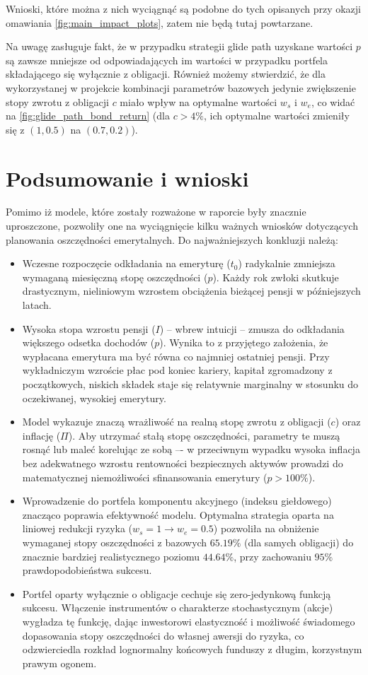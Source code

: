 \documentclass{article}
\begin{document}
Wnioski, które można z nich wyciągnąć są podobne do tych opisanych przy okazji omawiania \autoref{fig:main_impact_plots}, zatem nie będą tutaj powtarzane.

Na uwagę zasługuje fakt, że w przypadku strategii glide path uzyskane wartości $p$ są zawsze mniejsze od odpowiadających im wartości w przypadku portfela składającego się wyłącznie z obligacji.
Również możemy stwierdzić, że dla wykorzystanej w projekcie kombinacji parametrów bazowych jedynie zwiększenie stopy zwrotu z obligacji $c$ miało wpływ na optymalne wartości $w_s$ i $w_e$, co widać na \autoref{fig:glide_path_bond_return} (dla $c > 4\%$, ich optymalne wartości zmieniły się z $(1, 0.5)$ na $(0.7, 0.2)$).

\section{Podsumowanie i wnioski}
Pomimo iż modele, które zostały rozważone w raporcie były znacznie uproszczone, pozwoliły one na wyciągnięcie kilku ważnych wniosków dotyczących planowania oszczędności emerytalnych.
Do najważniejszych konkluzji należą:
\begin{itemize}
    \item Wczesne rozpoczęcie odkładania na emeryturę ($t_0$) radykalnie zmniejsza wymaganą miesięczną stopę oszczędności ($p$). Każdy rok zwłoki skutkuje drastycznym, nieliniowym wzrostem obciążenia bieżącej pensji w późniejszych latach.
    \item Wysoka stopa wzrostu pensji ($I$) -- wbrew intuicji -- zmusza do odkładania większego odsetka dochodów ($p$).
    Wynika to z przyjętego założenia, że wypłacana emerytura ma być równa co najmniej ostatniej pensji.
    Przy wykładniczym wzroście płac pod koniec kariery, kapitał zgromadzony z początkowych, niskich składek staje się relatywnie marginalny w stosunku do oczekiwanej, wysokiej emerytury.
    \item Model wykazuje znaczą wrażliwość na realną stopę zwrotu z obligacji ($c$) oraz inflację ($\Pi$).
    Aby utrzymać stałą stopę oszczędności, parametry te muszą rosnąć lub maleć korelując ze sobą –- w przeciwnym wypadku wysoka inflacja bez adekwatnego wzrostu rentowności bezpiecznych aktywów prowadzi do matematycznej niemożliwości sfinansowania emerytury ($p > 100\%$).
    \item Wprowadzenie do portfela komponentu akcyjnego (indeksu giełdowego) znacząco poprawia efektywność modelu.
    Optymalna strategia oparta na liniowej redukcji ryzyka ($w_s = 1 \to w_e = 0.5$) pozwoliła na obniżenie wymaganej stopy oszczędności z bazowych $65.19\%$ (dla samych obligacji) do znacznie bardziej realistycznego poziomu $44.64\%$, przy zachowaniu $95\%$ prawdopodobieństwa sukcesu.
    \item Portfel oparty wyłącznie o obligacje cechuje się zero-jedynkową funkcją sukcesu.
    Włączenie instrumentów o charakterze stochastycznym (akcje) wygładza tę funkcję, dając inwestorowi elastyczność i możliwość świadomego dopasowania stopy oszczędności do własnej awersji do ryzyka, co odzwierciedla rozkład lognormalny końcowych funduszy z długim, korzystnym prawym ogonem.
\end{itemize}
\end{document}
